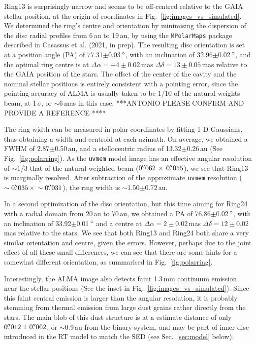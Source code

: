 \documentclass[letters,usenatbib,times]{mnras}
\begin{document}
Ring13 is surprisingly narrow and seems to be off-centred relative to the GAIA stellar position, at the origin of coordinates in Fig.~\ref{fig:images_vs_simulated}. We determined the ring's centre and orientation by minimising the dispersion of the disc radial profiles from 6\,au to 19\,au, by using the {\tt MPolarMaps} package described in Casassus et al. (2021, in prep). The resulting disc orientation is set at a position angle  (PA) of 77.31$\pm$0.03\,$\hbox{$^\circ$}$, with an  inclination of 32.96$\pm$0.02\,$\hbox{$^\circ$}$, and the optimal ring  centre is at $\Delta \alpha = -4\pm0.02$\,mas $\Delta \delta = 13\pm0.05$\,mas relative to the GAIA position of the stars. The offset of the center of the cavity and the nominal stellar positions is entirely consistent with a pointing error, since the pointing accuracy of ALMA is usually taken to be 1/10 of the natural-weights beam, at 1\,$\sigma$, or $\sim$6\,mas in this case. ***ANTONIO PLEASE CONFIRM AND PROVIDE A REFERENCE ****

The ring width can be measured in polar coordinates by fitting 1-D Gaussians, thus obtaining a width and centroid at each azimuth. On average, we obtained a FWHM of 2.87$\pm$0.50\,au, and a stellocentric radius of 13.32$\pm$0.26\,au (See Fig.~\ref{fig:polarring}). As the {\tt uvmem} model image has an effective angular resolution of $\sim$1/3 that of the natural-weighted beam ($0\hbox{$.\!\!^{\prime\prime}$}062 \,\times \, 0\hbox{$.\!\!^{\prime\prime}$}055$), we see that Ring13 is marginally resolved. After subtraction of the approximate {\tt uvmem} resolution ($\sim0\hbox{$.\!\!^{\prime\prime}$}035 \, \times \, \sim0\hbox{$.\!\!^{\prime\prime}$}031$), the ring width is $\sim$1.50$\pm$0.72\,au.

In a second optimization of the disc orientation, but this time aiming for Ring24 with a radial domain from 20\,au to 70\,au, we obtained a PA of 76.86$\pm$0.02\,$\hbox{$^\circ$}$, with an inclination of 33.92$\pm$0.01\,$\hbox{$^\circ$}$ and a centre at $\Delta \alpha = 2\pm0.02$\,mas $\Delta \delta = 12\pm0.02$\,mas relative to the stars. We see that both Ring13 and Ring24 both share a very similar orientation and centre, given the errors. However, perhaps due to the joint effect of all these small differences, we can see that there are some hints for a somewhat different orientation, as summarised in Fig.~\ref{fig:polarring}.

Interestingly, the ALMA image also detects faint 1.3\,mm continuum emission near the stellar positions (See the inset in Fig.~\ref{fig:images_vs_simulated}). Since this faint central emission is larger than the angular resolution, it is probably stemming from thermal emission from  large dust grains rather directly from the stars. The main blob of this dust structure is at a estimate distance of only $0\hbox{$.\!\!^{\prime\prime}$}012\pm0\hbox{$.\!\!^{\prime\prime}$}002$, or $\sim$0.9\,au from the binary system, and may be part of inner disc introduced in the RT model to match the SED (see Sec.~\ref{sec:model} below). 
\end{document}
